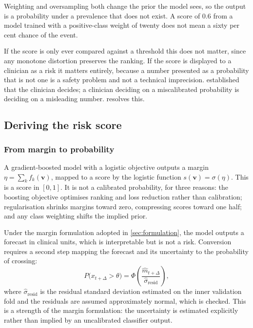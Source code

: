 \documentclass[12pt,a4paper,oneside]{report}
\begin{document}
Weighting and oversampling both change the prior the model sees, so the output is a probability under a prevalence that does not exist. A score of 0.6 from a model trained with a positive-class weight of twenty does not mean a sixty per cent chance of the event.

If the score is only ever compared against a threshold this does not matter, since any monotone distortion preserves the ranking. If the score is displayed to a clinician as a risk it matters entirely, because a number presented as a probability that is not one is a safety problem and not a technical imprecision.  established that the clinician decides; a clinician deciding on a miscalibrated probability is deciding on a misleading number.  resolves this.

\subsection{Deriving the risk score}\label{sec:risk-score}

\subsubsection{From margin to probability}

A gradient-boosted model with a logistic objective outputs a margin $\eta = \sum_k f_k(\mathbf{v})$, mapped to a score by the logistic function $s(\mathbf{v}) = \sigma(\eta)$. This is a score in $[0,1]$. It is not a calibrated probability, for three reasons: the boosting objective optimises ranking and loss reduction rather than calibration; regularisation shrinks margins toward zero, compressing scores toward one half; and any class weighting shifts the implied prior.

Under the margin formulation adopted in \cref{sec:formulation}, the model outputs a forecast in clinical units, which is interpretable but is not a risk. Conversion requires a second step mapping the forecast and its uncertainty to the probability of crossing:
\begin{equation}
  P\bigl(x_{t+\Delta} > \theta\bigr) = \Phi\!\left(\frac{\hat{m}_{t+\Delta}}{\hat{\sigma}_{\text{resid}}}\right),
\end{equation}
where $\hat{\sigma}_{\text{resid}}$ is the residual standard deviation estimated on the inner validation fold and the residuals are assumed approximately normal, which is checked. This is a strength of the margin formulation: the uncertainty is estimated explicitly rather than implied by an uncalibrated classifier output.
\end{document}
